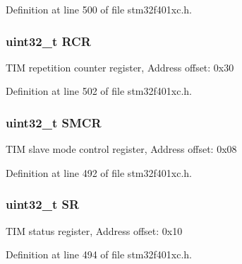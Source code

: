 Definition at line 500 of file stm32f401xc.\+h.

\subsubsection[{\texorpdfstring{R\+CR}{RCR}}]{ uint32\+\_\+t R\+CR}\hypertarget{struct_t_i_m___type_def_aa1b1b7107fcf35abe39d20f5dfc230ee}{}\label{struct_t_i_m___type_def_aa1b1b7107fcf35abe39d20f5dfc230ee}
T\+IM repetition counter register, Address offset\+: 0x30 

Definition at line 502 of file stm32f401xc.\+h.

\subsubsection[{\texorpdfstring{S\+M\+CR}{SMCR}}]{ uint32\+\_\+t S\+M\+CR}\hypertarget{struct_t_i_m___type_def_a2870732a4fc2ecd7bbecfbcbbf5528b7}{}\label{struct_t_i_m___type_def_a2870732a4fc2ecd7bbecfbcbbf5528b7}
T\+IM slave mode control register, Address offset\+: 0x08 

Definition at line 492 of file stm32f401xc.\+h.

\subsubsection[{\texorpdfstring{SR}{SR}}]{ uint32\+\_\+t SR}\hypertarget{struct_t_i_m___type_def_af6aca2bbd40c0fb6df7c3aebe224a360}{}\label{struct_t_i_m___type_def_af6aca2bbd40c0fb6df7c3aebe224a360}
T\+IM status register, Address offset\+: 0x10 

Definition at line 494 of file stm32f401xc.\+h.



